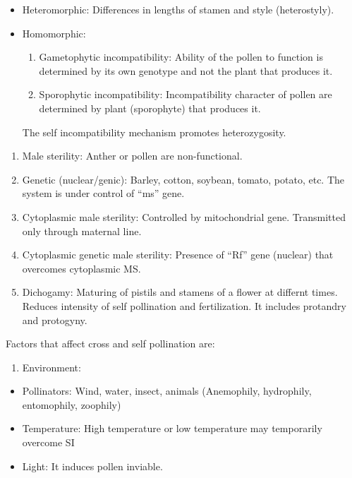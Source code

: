 \documentclass[
  openany]{book}
\providecommand{\tightlist}{%
  \setlength{\itemsep}{0pt}\setlength{\parskip}{0pt}}
\begin{document}
\begin{itemize}
\tightlist
\item
  Heteromorphic: Differences in lengths of stamen and style (heterostyly).
\item
  Homomorphic:

  \begin{enumerate}
  \def\labelenumi{\arabic{enumi}.}
  \tightlist
  \item
    Gametophytic incompatibility: Ability of the pollen to function is determined by its own genotype and not the plant that produces it.
  \item
    Sporophytic incompatibility: Incompatibility character of pollen are determined by plant (sporophyte) that produces it.
  \end{enumerate}

  The self incompatibility mechanism promotes heterozygosity.
\end{itemize}

\begin{enumerate}
\def\labelenumi{\arabic{enumi}.}
\setcounter{enumi}{1}
\item
  Male sterility: Anther or pollen are non-functional.
\item
  Genetic (nuclear/genic): Barley, cotton, soybean, tomato, potato, etc. The system is under control of ``ms'' gene.
\item
  Cytoplasmic male sterility: Controlled by mitochondrial gene. Transmitted only through maternal line.
\item
  Cytoplasmic genetic male sterility: Presence of ``Rf'' gene (nuclear) that overcomes cytoplasmic MS.
\item
  Dichogamy: Maturing of pistils and stamens of a flower at differnt times. Reduces intensity of self pollination and fertilization. It includes protandry and protogyny.
\end{enumerate}

Factors that affect cross and self pollination are:

\begin{enumerate}
\def\labelenumi{\arabic{enumi}.}
\tightlist
\item
  Environment:
\end{enumerate}

\begin{itemize}
\tightlist
\item
  Pollinators: Wind, water, insect, animals (Anemophily, hydrophily, entomophily, zoophily)
\item
  Temperature: High temperature or low temperature may temporarily overcome SI
\item
  Light: It induces pollen inviable.
\end{itemize}
\end{document}
